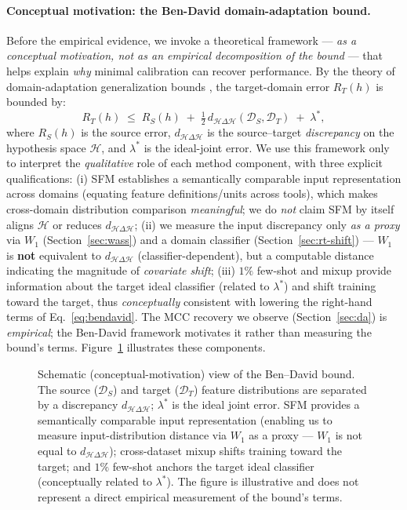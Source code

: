 \documentclass[preprint,12pt,authoryear]{elsarticle}
\begin{document}
\paragraph{Conceptual motivation: the Ben-David domain-adaptation bound.} Before
the empirical evidence, we invoke a theoretical framework --- \emph{as a conceptual
motivation, not as an empirical decomposition of the bound} --- that helps explain
\emph{why} minimal calibration can recover performance. By the theory of
domain-adaptation generalization bounds \citep{bendavid}, the target-domain error
$R_T(h)$ is bounded by:
\begin{equation}
\label{eq:bendavid}
R_T(h) \;\le\; R_S(h) \;+\; \tfrac{1}{2}\, d_{\mathcal{H}\Delta\mathcal{H}}(\mathcal{D}_S, \mathcal{D}_T) \;+\; \lambda^\ast,
\end{equation}
where $R_S(h)$ is the source error, $d_{\mathcal{H}\Delta\mathcal{H}}$ is the
source--target \emph{discrepancy} on the hypothesis space $\mathcal{H}$, and
$\lambda^\ast$ is the ideal-joint error. We use this framework only to interpret
the \emph{qualitative} role of each method component, with three explicit
qualifications: (i) SFM establishes a semantically comparable input representation
across domains (equating feature definitions/units across tools), which makes
cross-domain distribution comparison \emph{meaningful}; we do \emph{not} claim SFM
by itself aligns $\mathcal{H}$ or reduces $d_{\mathcal{H}\Delta\mathcal{H}}$; (ii)
we measure the input discrepancy only \emph{as a proxy} via $W_1$
(Section~\ref{sec:wass}) and a domain classifier (Section~\ref{sec:rt-shift}) ---
$W_1$ is \textbf{not} equivalent to $d_{\mathcal{H}\Delta\mathcal{H}}$
(classifier-dependent), but a computable distance indicating the magnitude of
\emph{covariate shift}; (iii) $1\%$ few-shot and mixup provide information about the
target ideal classifier (related to $\lambda^\ast$) and shift training toward the
target, thus \emph{conceptually} consistent with lowering the right-hand terms of
Eq.~\eqref{eq:bendavid}. The MCC recovery we observe (Section~\ref{sec:da}) is
\emph{empirical}; the Ben-David framework motivates it rather than measuring the
bound's terms. Figure~\ref{fig:bendavid} illustrates these components.

\begin{figure}[h]
\centering
\resizebox{0.9\linewidth}{!}{}
\caption{Schematic (conceptual-motivation) view of the Ben--David bound. The source
($\mathcal{D}_S$) and target ($\mathcal{D}_T$) feature distributions are separated
by a discrepancy $d_{\mathcal{H}\Delta\mathcal{H}}$; $\lambda^\ast$ is the ideal
joint error. SFM provides a semantically comparable input representation (enabling
us to measure input-distribution distance via $W_1$ as a proxy --- $W_1$ is not
equal to $d_{\mathcal{H}\Delta\mathcal{H}}$); cross-dataset mixup shifts training
toward the target; and $1\%$ few-shot anchors the target ideal classifier
(conceptually related to $\lambda^\ast$). The figure is illustrative and does not
represent a direct empirical measurement of the bound's terms.}
\label{fig:bendavid}
\end{figure}
\end{document}
